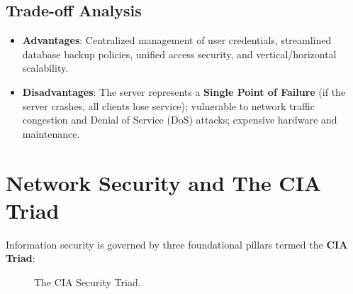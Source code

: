 \subsection{Trade-off Analysis}
\begin{itemize}
    \item \textbf{Advantages}: Centralized management of user credentials, streamlined database backup policies, unified access security, and vertical/horizontal scalability.
    \item \textbf{Disadvantages}: The server represents a \textbf{Single Point of Failure} (if the server crashes, all clients lose service); vulnerable to network traffic congestion and Denial of Service (DoS) attacks; expensive hardware and maintenance.
\end{itemize}

\section{Network Security and The CIA Triad}

Information security is governed by three foundational pillars termed the \textbf{CIA Triad}:

\begin{figure}[htbp]
\centering
{}
\caption{The CIA Security Triad.}
\label{fig:cia-triad}
\end{figure}

